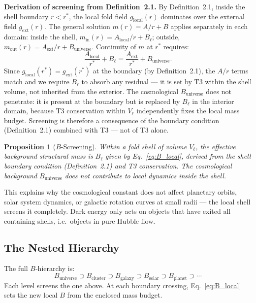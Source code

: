 \documentclass[12pt]{article}
\newtheorem{proposition}{Proposition}
\begin{document}
\textbf{Derivation of screening from Definition~2.1.}
By Definition~2.1, inside the shell boundary $r < r^*$, the local
fold field $g_{\mathrm{local}}(r)$ dominates over the external field
$g_{\mathrm{ext}}(r)$.
The general solution $m(r) = A/r + B$ applies separately in each
domain: inside the shell, $m_{\mathrm{in}}(r) = A_{\mathrm{local}}/r + B_\ell$;
outside, $m_{\mathrm{out}}(r) = A_{\mathrm{ext}}/r + B_{\mathrm{universe}}$.
Continuity of $m$ at $r^*$ requires:
\begin{equation}
  \frac{A_{\mathrm{local}}}{r^*} + B_\ell =
  \frac{A_{\mathrm{ext}}}{r^*} + B_{\mathrm{universe}}.
\end{equation}
Since $g_{\mathrm{local}}(r^*) = g_{\mathrm{ext}}(r^*)$ at the boundary
(by Definition~2.1), the $A/r$ terms match and we require $B_\ell$
to absorb any residual --- it is set by T3 within the shell volume,
not inherited from the exterior.
The cosmological $B_{\mathrm{universe}}$ does not penetrate: it is
present at the boundary but is replaced by $B_\ell$ in the interior
domain, because T3 conservation within $V_\ell$ independently fixes
the local mass budget.
Screening is therefore a consequence of the boundary condition
(Definition~2.1) combined with T3 --- not of T3 alone.

\begin{proposition}[$B$-Screening]
  Within a fold shell of volume $V_\ell$, the effective background
  structural mass is $B_\ell$ given by Eq.~\eqref{eq:B_local},
  derived from the shell boundary condition (Definition~2.1) and
  T3 conservation.
  The cosmological background $B_{\mathrm{universe}}$ does not
  contribute to local dynamics inside the shell.
\end{proposition}

This explains why the cosmological constant does not affect planetary
orbits, solar system dynamics, or galactic rotation curves at small
radii --- the local shell screens it completely. Dark energy only acts
on objects that have exited all containing shells, i.e.\ objects in
pure Hubble flow.

\subsection{The Nested Hierarchy}

The full $B$-hierarchy is:
\begin{equation}
  B_{\mathrm{universe}} \supset B_{\mathrm{cluster}} \supset
  B_{\mathrm{galaxy}} \supset B_{\mathrm{solar}} \supset
  B_{\mathrm{planet}} \supset \cdots
\end{equation}
Each level screens the one above. At each boundary crossing,
Eq.~\eqref{eq:B_local} sets the new local $B$ from the enclosed
mass budget.
\end{document}
